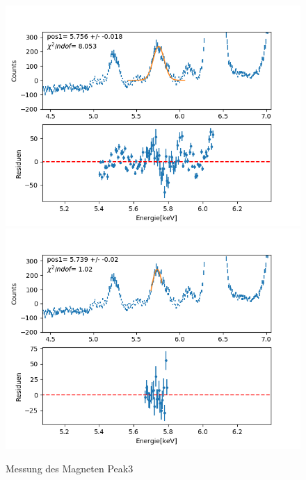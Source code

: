 \documentclass[12pt,a4paper]{article}
\begin{document}
\begin{figure}[H]
\centering
\includegraphics[scale=0.49]{Bilder/roentgen_spektren/magnet/mag3_1.png}
\includegraphics[scale=0.49]{Bilder/roentgen_spektren/magnet/mag3_2.png}
\caption{Messung des Magneten Peak3}
\end{figure}
\end{document}
